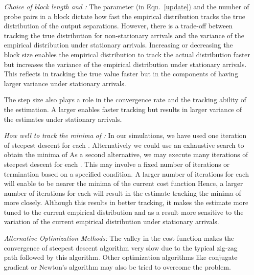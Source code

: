 \documentclass[11pt]{article}
\begin{document}
\noindent
\emph{Choice of  block length and :} The parameter 
(in Eqn.~\ref{update}) and the number of probe pairs in a block
dictate how fast the empirical distribution tracks the true
distribution of the output separations.  However, there is a trade-off
between tracking the true distribution for non-stationary arrivals and
the variance of the empirical distribution under stationary arrivals.
Increasing  or decreasing the block size enables the empirical
distribution to track the actual distribution faster but increases the
variance of the empirical distribution under stationary arrivals. This
reflects in  tracking the true value faster
but in the components of  having larger
variance under stationary arrivals.

The step size  also plays a role in the convergence rate and
the tracking ability of the estimation. A larger  enables
faster tracking but results in larger variance of the estimates under
stationary arrivals.

\noindent
\emph{How well to track the minima of  :} In our simulations, we have
used one iteration of steepest descent for each .  Alternatively we
could use an exhaustive search to obtain the minima of  As a second alternative, we may
execute many iterations of steepest descent for each . This may
involve a fixed number of iterations or termination based on a
specified condition.  A larger number of iterations for each  will
enable  to be nearer the minima of the
current cost function  Hence, a larger number
of iterations for each  will result in the estimate
 tracking the minima of  more closely.  Although this results in better tracking, it
makes the estimate more tuned to the current empirical distribution
and as a result more sensitive to the variation of the current
empirical distribution under stationary arrivals.

\noindent
\emph{Alternative Optimization Methods:} The valley in the cost
function makes the convergence of steepest descent algorithm very slow
due to the typical zig-zag path followed by this algorithm.  Other
optimization algorithms like conjugate gradient or Newton's algorithm
may also be tried to overcome the problem.
\end{document}
